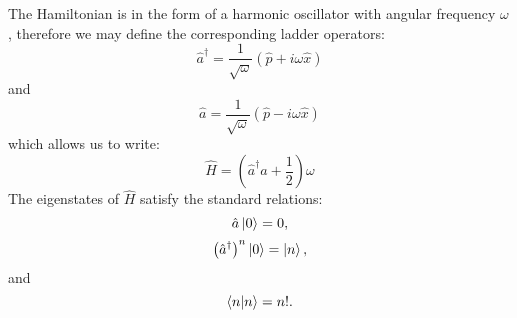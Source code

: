 \documentclass[12pt]{article}
\begin{document}
The Hamiltonian is in the form of a harmonic oscillator with angular frequency $\omega$, therefore we may define the corresponding ladder operators:
\begin{equation}
	\label{eq:HarmonicCreation}
	\hat{a}^\dagger = \frac{1}{\sqrt{\omega}}\left(\hat{p}+i\omega\hat{x}\right)
\end{equation}
and
\begin{equation}
	\label{eq:HarmonicAnhilation}
	\hat{a} = \frac{1}{\sqrt{\omega}}\left(\hat{p}-i\omega\hat{x}\right)
\end{equation}
which allows us to write:
\begin{equation}
	\label{HamiltonianLadder}
	\hat{H} = \left(\hat{a}^\dagger\hat{a}+\frac{1}{2}\right)\omega
\end{equation}
The eigenstates of $\hat{H}$ satisfy the standard relations:
\begin{equation}
	\label{LadderOnZero}
	\hat{a}\ket{0} = 0,
\end{equation}
\begin{equation}
	\label{LadderNOnZero}
	\left(\hat{a}^\dagger\right)^n\ket{0} = \ket{n},
\end{equation}
and
\begin{equation}
	\label{InnernProduct}
	\braket{n|n}=n!.
\end{equation}
\end{document}
